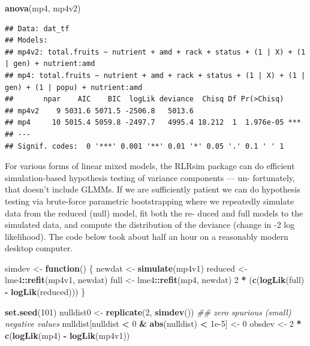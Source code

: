 \documentclass[
  12pt,
]{book}
\newenvironment{Shaded}{\begin{snugshade}}{\end{snugshade}}
\newcommand{\CommentTok}[1]{\textcolor[rgb]{0.56,0.35,0.01}{\textit{#1}}}
\newcommand{\ControlFlowTok}[1]{\textcolor[rgb]{0.13,0.29,0.53}{\textbf{#1}}}
\newcommand{\DecValTok}[1]{\textcolor[rgb]{0.00,0.00,0.81}{#1}}
\newcommand{\FloatTok}[1]{\textcolor[rgb]{0.00,0.00,0.81}{#1}}
\newcommand{\KeywordTok}[1]{\textcolor[rgb]{0.13,0.29,0.53}{\textbf{#1}}}
\newcommand{\NormalTok}[1]{#1}
\newcommand{\OperatorTok}[1]{\textcolor[rgb]{0.81,0.36,0.00}{\textbf{#1}}}
\newcommand{\StringTok}[1]{\textcolor[rgb]{0.31,0.60,0.02}{#1}}
\begin{document}
\begin{Shaded}
\begin{Highlighting}[]
\KeywordTok{anova}\NormalTok{(mp4, mp4v2)}
\end{Highlighting}
\end{Shaded}

\begin{verbatim}
## Data: dat_tf
## Models:
## mp4v2: total.fruits ~ nutrient + amd + rack + status + (1 | X) + (1 | gen) + nutrient:amd
## mp4: total.fruits ~ nutrient + amd + rack + status + (1 | X) + (1 | gen) + (1 | popu) + nutrient:amd
##       npar    AIC    BIC  logLik deviance  Chisq Df Pr(>Chisq)    
## mp4v2    9 5031.6 5071.5 -2506.8   5013.6                         
## mp4     10 5015.4 5059.8 -2497.7   4995.4 18.212  1  1.976e-05 ***
## ---
## Signif. codes:  0 '***' 0.001 '**' 0.01 '*' 0.05 '.' 0.1 ' ' 1
\end{verbatim}

For various forms of linear mixed models, the RLRsim package can do efficient simulation-based hypothesis testing of variance components --- un- fortunately, that doesn't include GLMMs.
If we are sufficiently patient we can do hypothesis testing via brute-force parametric bootstrapping where we repeatedly simulate data from the reduced (null) model, fit both the re- duced and full models to the simulated data, and compute the distribution of the deviance (change in -2 log likelihood).
The code below took about half an hour on a reasonably modern desktop computer.

\begin{Shaded}
\begin{Highlighting}[]
\NormalTok{simdev \textless{}{-}}\StringTok{ }\ControlFlowTok{function}\NormalTok{() \{}
\NormalTok{  newdat \textless{}{-}}\StringTok{ }\KeywordTok{simulate}\NormalTok{(mp4v1)}
\NormalTok{  reduced \textless{}{-}}\StringTok{ }\NormalTok{lme4}\OperatorTok{::}\KeywordTok{refit}\NormalTok{(mp4v1, newdat)}
\NormalTok{  full \textless{}{-}}\StringTok{ }\NormalTok{lme4}\OperatorTok{::}\KeywordTok{refit}\NormalTok{(mp4, newdat)}
  \DecValTok{2} \OperatorTok{*}\StringTok{ }\NormalTok{(}\KeywordTok{c}\NormalTok{(}\KeywordTok{logLik}\NormalTok{(full) }\OperatorTok{{-}}\StringTok{ }\KeywordTok{logLik}\NormalTok{(reduced)))}
\NormalTok{\}}

\KeywordTok{set.seed}\NormalTok{(}\DecValTok{101}\NormalTok{)}
\NormalTok{nulldist0 \textless{}{-}}\StringTok{ }\KeywordTok{replicate}\NormalTok{(}\DecValTok{2}\NormalTok{, }\KeywordTok{simdev}\NormalTok{())}
\CommentTok{\#\# zero spurious (small) negative values}
\NormalTok{nulldist[nulldist }\OperatorTok{\textless{}}\StringTok{ }\DecValTok{0} \OperatorTok{\&}\StringTok{ }\KeywordTok{abs}\NormalTok{(nulldist) }\OperatorTok{\textless{}}\StringTok{ }\FloatTok{1e{-}5}\NormalTok{] \textless{}{-}}\StringTok{ }\DecValTok{0}
\NormalTok{obsdev \textless{}{-}}\StringTok{ }\DecValTok{2} \OperatorTok{*}\StringTok{ }\KeywordTok{c}\NormalTok{(}\KeywordTok{logLik}\NormalTok{(mp4) }\OperatorTok{{-}}\StringTok{ }\KeywordTok{logLik}\NormalTok{(mp4v1))}
\end{Highlighting}
\end{Shaded}
\end{document}
